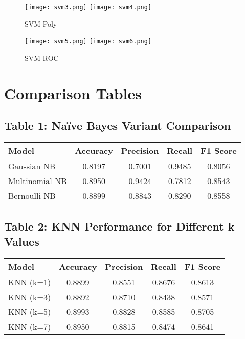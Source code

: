 \documentclass[12pt]{article}
\begin{document}
\begin{figure}[H]
\centering
\texttt{[image: svm3.png]}
\texttt{[image: svm4.png]}
\caption{SVM Poly}
\end{figure}

\begin{figure}[H]
\centering
\texttt{[image: svm5.png]}
\texttt{[image: svm6.png]}
\caption{SVM ROC}
\end{figure}



\section*{Comparison Tables}

\subsection*{Table 1: Naïve Bayes Variant Comparison}
\begin{center}
\begin{tabular}{lcccc}
\toprule
\textbf{Model} & \textbf{Accuracy} & \textbf{Precision} & \textbf{Recall} & \textbf{F1 Score} \\
\midrule
Gaussian NB     & 0.8197 & 0.7001 & 0.9485 & 0.8056 \\
Multinomial NB  & 0.8950 & 0.9424 & 0.7812 & 0.8543 \\
Bernoulli NB    & 0.8899 & 0.8843 & 0.8290 & 0.8558 \\
\bottomrule
\end{tabular}
\end{center}

\vspace{1em}

\subsection*{Table 2: KNN Performance for Different k Values}
\begin{center}
\begin{tabular}{lcccc}
\toprule
\textbf{Model} & \textbf{Accuracy} & \textbf{Precision} & \textbf{Recall} & \textbf{F1 Score} \\
\midrule
KNN (k=1) & 0.8899 & 0.8551 & 0.8676 & 0.8613 \\
KNN (k=3) & 0.8892 & 0.8710 & 0.8438 & 0.8571 \\
KNN (k=5) & 0.8993 & 0.8828 & 0.8585 & 0.8705 \\
KNN (k=7) & 0.8950 & 0.8815 & 0.8474 & 0.8641 \\
\bottomrule
\end{tabular}
\end{center}
\end{document}
